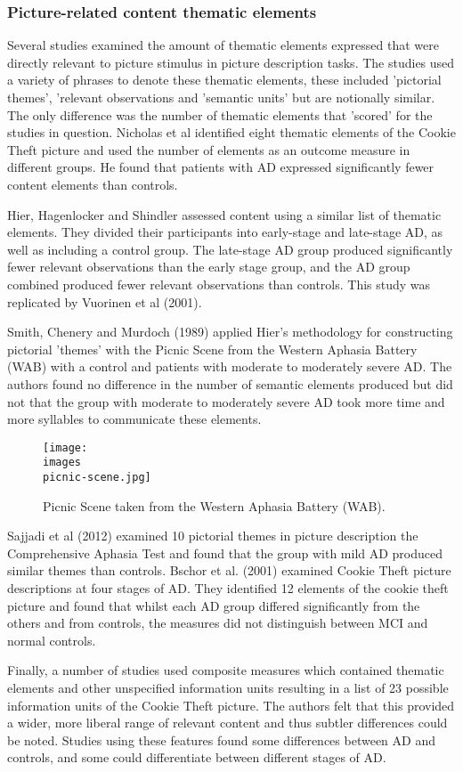 \documentclass{article}
\begin{document}
\subsubsection{Picture-related content thematic elements}
Several studies examined the amount of thematic elements expressed that were directly relevant to picture stimulus in picture description tasks. The studies used a variety of phrases to denote these thematic elements, these included 'pictorial themes', 'relevant observations and 'semantic units' but are notionally similar. The only difference was the number of thematic elements that 'scored' for the studies in question. Nicholas et al identified eight thematic elements of the Cookie Theft picture and used the number of elements as an outcome measure in different groups. He found that patients with AD expressed significantly fewer content elements than controls.
\par
Hier, Hagenlocker and Shindler assessed content using a similar list of thematic elements. They divided their participants into early-stage and late-stage AD, as well as including a control group. The late-stage AD group produced significantly fewer relevant observations than the early stage group, and the AD group combined produced fewer relevant observations than controls. This study was replicated by Vuorinen et al (2001).
\par
Smith, Chenery and Murdoch (1989) applied Hier's methodology for constructing pictorial 'themes' with the Picnic Scene from the Western Aphasia Battery (WAB) with a control and patients with moderate to moderately severe AD. The authors found no difference in the number of semantic elements produced but did not that the group with moderate to moderately severe AD took more time and more syllables to communicate these elements.
\par
\begin{figure}[H]
\centering
\texttt{[image: \\images\\picnic-scene.jpg]}
\caption{Picnic Scene taken from the Western Aphasia Battery (WAB).\label{white}}
\end{figure}
Sajjadi et al (2012) examined 10 pictorial themes in picture description the Comprehensive Aphasia Test and found that the group with mild AD produced similar themes than controls. Bschor et al. (2001) examined Cookie Theft picture descriptions at four stages of AD. They identified 12 elements of the cookie theft picture and found that whilst each AD group differed significantly from the others and from controls, the measures did not distinguish between MCI and normal controls.
\par
Finally, a number of studies used composite measures which contained thematic elements and other unspecified information units resulting in a list of 23 possible information units of the Cookie Theft picture. The authors felt that this provided a wider, more liberal range of relevant content and thus subtler differences could be noted. Studies using these features found some differences between AD and controls, and some could differentiate between different stages of AD.
\end{document}
